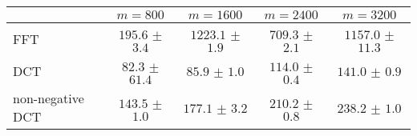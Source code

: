 \centering
\renewcommand{\arraystretch}{1.2}
\begin{tabular}{@{}lcccc@{}}
\toprule
 & $m=800$ & $m=1600$ & $m=2400$ & $m=3200$\\
\midrule
FFT & $195.6$ $\pm$ $3.4$ & $1223.1$ $\pm$ $1.9$ & $709.3$ $\pm$ $2.1$ & $1157.0$ $\pm$ $11.3$ \\
DCT & $82.3$ $\pm$ $61.4$ & $85.9$ $\pm$ $1.0$ & $114.0$ $\pm$ $0.4$ & $141.0$ $\pm$ $0.9$ \\
non-negative DCT & $143.5$ $\pm$ $1.0$ & $177.1$ $\pm$ $3.2$ & $210.2$ $\pm$ $0.8$ & $238.2$ $\pm$ $1.0$ \\
\bottomrule
\end{tabular}
